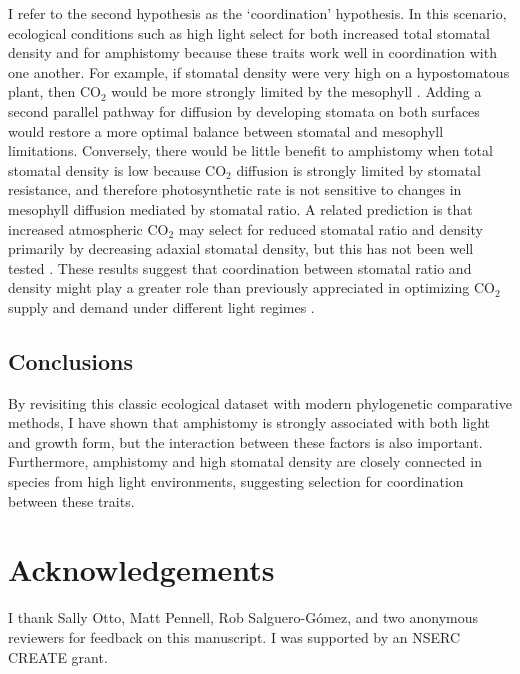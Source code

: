 \documentclass[12pt, oneside]{article}
\begin{document}
I refer to the second hypothesis as the `coordination' hypothesis. In this scenario, ecological conditions such as high light select for both increased total stomatal density and for amphistomy because these traits work well in coordination with one another. For example, if stomatal density were very high on a hypostomatous plant, then CO$_2$ would be more strongly limited by the mesophyll \citep{Flexas_etal_2012}. Adding a second parallel pathway for diffusion by developing stomata on both surfaces would restore a more optimal balance between stomatal and mesophyll limitations. Conversely, there would be little benefit to amphistomy when total stomatal density is low because CO$_2$ diffusion is strongly limited by stomatal resistance, and therefore photosynthetic rate is not sensitive to changes in mesophyll diffusion mediated by stomatal ratio. A related prediction is that increased atmospheric CO$_2$ may select for reduced stomatal ratio and density primarily by decreasing adaxial stomatal density, but this has not been well tested \citep[but see][]{Woodward_Bazzaz_1988}. These results suggest that coordination between stomatal ratio and density might play a greater role than previously appreciated in optimizing CO$_2$ supply and demand under different light regimes \citep[see also][]{Beerling_Kelly_1996}.

\subsection*{Conclusions}

By revisiting this classic ecological dataset with modern phylogenetic comparative methods, I have shown that amphistomy is strongly associated with both light and growth form, but the interaction between these factors is also important. Furthermore, amphistomy and high stomatal density are closely connected in species from high light environments, suggesting selection for coordination between these traits.


\section*{Acknowledgements}
I thank Sally Otto, Matt Pennell, Rob Salguero-G\'{o}mez, and two anonymous reviewers for feedback on this manuscript. I was supported by an NSERC CREATE grant.
\end{document}
